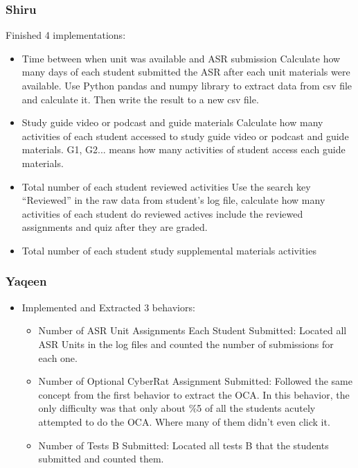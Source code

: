 \documentclass[12pt]{article}
\begin{document}
	\subsubsection{Shiru}
	Finished 4 implementations:
	\begin{itemize}
		\item Time between when unit was available and ASR submission
Calculate how many days of each student submitted the ASR after each unit materials were available. Use Python pandas and numpy library to extract data from csv file and calculate it. Then write the result to a new csv file.
		\item Study guide video or podcast and guide materials
Calculate how many activities of each student accessed to study guide video or podcast and guide materials. G1, G2... means how many activities of student access each guide materials.
		\item Total number of each student reviewed activities
Use the search key “Reviewed” in the raw data from student’s log file, calculate how many activities of each student do reviewed actives include the reviewed assignments and quiz after they are graded.
		\item Total number of each student study supplemental materials activities
	\end{itemize}

	\subsubsection{Yaqeen}
	\begin{itemize}
		\item Implemented and Extracted 3 behaviors: 
		\begin{itemize}
			\item Number of ASR Unit Assignments Each Student Submitted: Located all ASR Units in the log files and counted the number of submissions for each one. 
			\item Number of Optional CyberRat Assignment Submitted:
Followed the same concept from the first behavior to extract the OCA. In this behavior, the only difficulty was that only about \%5 of all the students acutely attempted to do the OCA. Where many of them didn’t even click it.
\item Number of Tests B Submitted:
Located all tests B that the students submitted and counted them.

		\end{itemize}
	\end{itemize}
\end{document}

